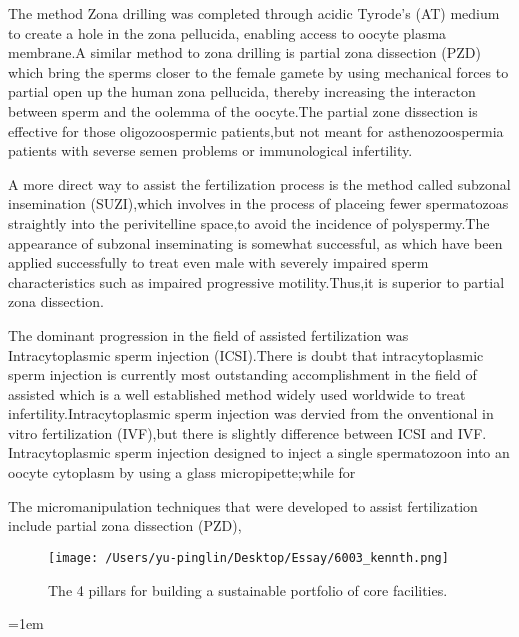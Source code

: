 \documentclass[12pt]{article}
\begin{document}
The method Zona drilling was completed through acidic Tyrode’s (AT) medium to create a hole in the zona pellucida, enabling access to oocyte plasma membrane.A similar method to zona drilling is partial zona dissection (PZD) which bring the sperms closer to the female gamete by using mechanical forces to partial open up the human zona pellucida, thereby increasing the interacton between sperm and the oolemma of the oocyte.The partial zone dissection is effective for those oligozoospermic patients,but not meant for asthenozoospermia patients with severse semen problems or immunological infertility.\medskip

A more direct way to assist the fertilization process is the method called  subzonal insemination (SUZI),which involves in the process of placeing fewer spermatozoas straightly  into the perivitelline space,to avoid the incidence of polyspermy.The appearance of subzonal inseminating is somewhat successful, as which have been applied successfully to treat even male with severely impaired sperm characteristics such as impaired progressive motility.Thus,it is superior to partial zona dissection.\medskip

The dominant progression in the field of assisted
fertilization was Intracytoplasmic sperm injection (ICSI).There is doubt that intracytoplasmic sperm injection is currently most outstanding  accomplishment in the field of assisted which is a well established method widely used worldwide to treat infertility.Intracytoplasmic sperm injection was dervied from the onventional in vitro fertilization (IVF),but there is slightly difference between ICSI and IVF. Intracytoplasmic sperm injection designed to inject a single spermatozoon into an oocyte cytoplasm by using a glass micropipette;while for 

The micromanipulation techniques that were developed to assist fertilization
include partial zona dissection (PZD), 

\begin{figure}[H]
    \texttt{[image: /Users/yu-pinglin/Desktop/Essay/6003\_kennth.png]}
    \centering
    \caption{The 4 pillars for building a sustainable portfolio of
    core facilities.}
\end{figure}









\emergencystretch=1em
\printbibliography[title=Reference]
\end{document}

